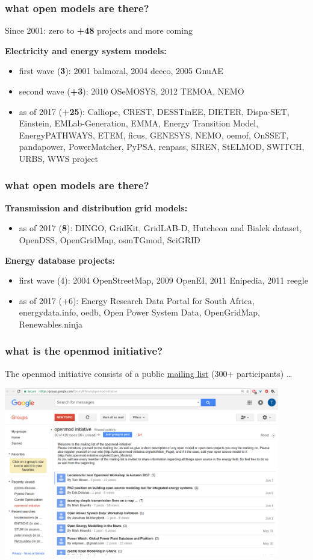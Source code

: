 \documentclass[12pt,aspectratio=169]{beamer}
\let\olditem\item
\renewcommand{\item}{%
\olditem\vspace{5pt}}
\begin{document}
\begin{frame}
  \frametitle{what open models are there?}

  Since 2001: zero to {\bf +48} projects and more coming

  {\bf Electricity and energy system models:}
  \begin{itemize}
  \item first wave ({\bf 3}): 2001 balmoral, 2004 deeco, 2005 GnuAE
  \item second wave ({\bf +3}): 2010 OSeMOSYS, 2012 TEMOA, NEMO
   \item  as of 2017 ({\bf +25}): Calliope, CREST, DESSTinEE, DIETER, Dispa-SET, Einstein,
  EMLab-Generation, EMMA, Energy Transition Model, EnergyPATHWAYS,
  ETEM, ficus, GENESYS, NEMO, oemof, OnSSET, pandapower, PowerMatcher,
  PyPSA, renpass, SIREN, StELMOD, SWITCH, URBS, WWS project
  \end{itemize}
\end{frame}

\begin{frame}
  \frametitle{what open models are there?}

  {\bf Transmission and distribution grid models:}
  \begin{itemize}
    \item as of 2017 ({\bf 8}): DINGO, GridKit, GridLAB-D, Hutcheon and Bialek dataset,
  OpenDSS, OpenGridMap, osmTGmod, SciGRID
  \end{itemize}

  {\bf Energy database projects:}
  \begin{itemize}
  \item first wave (4): 2004 OpenStreetMap, 2009 OpenEI, 2011 Enipedia, 2011 reegle
  \item as of 2017 (+6): Energy Research Data Portal for South Africa, energydata.info,
  oedb, Open Power System Data, OpenGridMap, Renewables.ninja
  \end{itemize}

\end{frame}


\begin{frame}
  \frametitle{what is the openmod initiative?}

  The openmod initiative consists of a public \alert{\href{https://groups.google.com/forum/\#!forum/openmod-initiative}{mailing list}} (300+ participants) \dots

  \centering
  \includegraphics[width=12cm]{openmod-mailing_list}

\end{frame}
\end{document}
